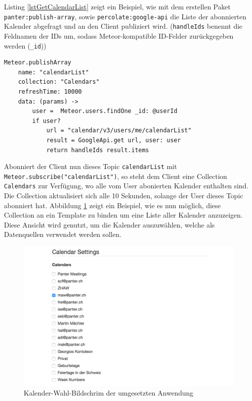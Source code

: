 \documentclass[]{article}
\begin{document}
Listing \ref{lstGetCalendarList} zeigt ein Beispiel, wie mit dem
erstellen Paket \lstinline!panter:publish-array!, sowie
\lstinline!percolate:google-api! die Liste der abonnierten Kalender
abgefragt und an den Client publiziert wird. (\lstinline!handleIds!
benennt die Feldnamen der IDs um, sodass Meteor-kompatible ID-Felder
zurückgegeben werden (\lstinline!_id!))

\begin{lstlisting}[caption=Publizieren der Google Kalender mit Hilfe von `panter:publish-array` in CoffeeScript, label=lstGetCalendarList]
Meteor.publishArray 
    name: "calendarList"
    collection: "Calendars"
    refreshTime: 10000
    data: (params) ->
        user =  Meteor.users.findOne _id: @userId
        if user?
            url = "calendar/v3/users/me/calendarList"
            result = GoogleApi.get url, user: user
            return handleIds result.items
\end{lstlisting}

Abonniert der Client nun dieses Topic \lstinline!calendarList! mit
\lstinline!Meteor.subscribe("calendarList")!, so steht dem Client eine
Collection \lstinline!Calendars! zur Verfügung, wo alle vom User
abonierten Kalender enthalten sind. Die Collection aktualisiert sich
alle 10 Sekunden, solange der User dieses Topic abonniert hat. Abbildung
\ref{figCalendarSettings} zeigt ein Beispiel, wie es nun möglich, diese
Collection an ein Template zu binden um eine Liste aller Kalender
anzuzeigen. Diese Ansicht wird genutzt, um die Kalender auszuwählen,
welche als Datenquellen verwendet werden sollen.

\begin{figure}[htbp]
\centering
\includegraphics{../img/calendarSettings.png}
\caption{Kalender-Wahl-Bildschrim der umgesetzten
Anwendung\label{figCalendarSettings}}
\end{figure}
\end{document}
